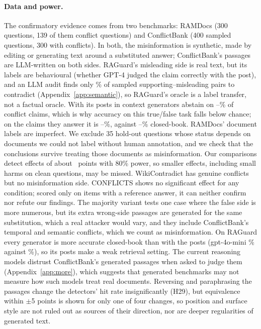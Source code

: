 \paragraph{Data and power.} The confirmatory evidence comes from two benchmarks: RAMDocs (300 questions, 139 of them
conflict questions) and ConflictBank (400 sampled questions, 300 with conflicts). In both, the misinformation is
synthetic, made by editing or generating text around a substituted answer; ConflictBank's passages are LLM-written
on both sides. RAGuard's misleading side is real text, but its labels are behavioural (whether GPT-4 judged the claim
correctly with the post), and an LLM audit finds only \rgAudContradict\% of sampled supporting--misleading pairs to
contradict (Appendix~\ref{app:semantic}), so RAGuard's oracle is a label transfer, not a factual oracle. With its posts in context
generators abstain on \rgAbstMin--\rgAbstMax\% of conflict claims, which is why accuracy on this true/false task
falls below chance; on the claims they answer it is \rgAnsMin--\rgAnsMax\%, against \rgCbMin--\rgCbMax\% closed-book. RAMDocs' document labels are imperfect. We exclude 35 hold-out
questions whose status depends on documents we could not label without human annotation, and we check that the
conclusions survive treating those documents as misinformation. Our comparisons detect effects of about
\mdeMed\ points with 80\% power, so smaller effects, including small harms on clean questions, may be missed.
WikiContradict has genuine conflicts but no misinformation side. CONFLICTS shows no significant effect for any
condition; scored only on items with a reference answer, it can neither confirm nor refute our findings. The majority variant tests one case where the false side is
more numerous, but its extra wrong-side passages are generated for the same substitution, which a real attacker
would vary, and they include ConflictBank's temporal and semantic conflicts, which we count as misinformation. On
RAGuard every generator is more accurate closed-book than with the posts (gpt-4o-mini \zcRgMiniConflict\% against
\zpRgMiniConflict\%), so its posts make a weak retrieval setting. The current
reasoning models distrust ConflictBank's generated passages when asked to judge them (Appendix~\ref{app:more}),
which suggests that generated benchmarks may not measure how such models treat real documents. Reversing and
paraphrasing the passages change the detectors' hit rate insignificantly (H29), but equivalence within $\pm$5 points
is shown for only one of four changes, so position and surface style are not ruled out as sources of their direction,
nor are deeper regularities of generated text.

